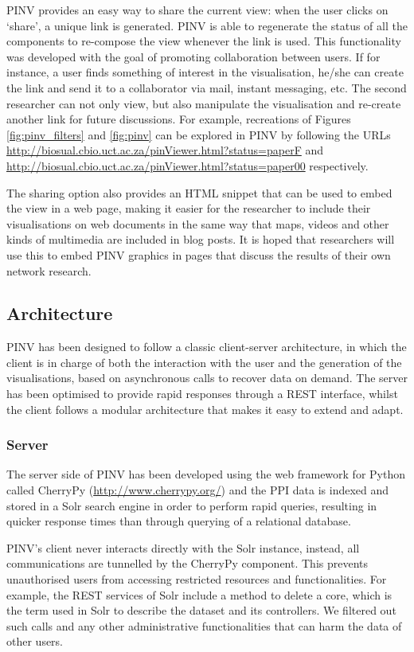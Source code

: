 PINV provides an easy way to share the current view: when the user clicks on `share', a unique link is generated. PINV is able to regenerate the status of all the components to re-compose the view whenever the link is used. 
This functionality was developed with the goal of promoting collaboration between users. If for instance, a user finds something of interest in the visualisation, he/she can create the link and send it to a collaborator via mail, instant messaging, etc. The second researcher can not only view, but also manipulate the visualisation and re-create another link for future discussions. For example, recreations of Figures \ref{fig:pinv_filters} and \ref{fig:pinv} can be explored in PINV by following the URLs \url{http://biosual.cbio.uct.ac.za/pinViewer.html?status=paperF} and \url{http://biosual.cbio.uct.ac.za/pinViewer.html?status=paper00} respectively.

The sharing option also provides an HTML snippet that can be used to embed the view in a web page, making it easier for the researcher to include their visualisations on web documents in the same way that maps, videos and other kinds of multimedia are included in blog posts. It is hoped that researchers will use this to embed PINV graphics in pages that discuss the results of their own network research.

\subsection{Architecture} \label{pinv_architecture}
PINV has been designed to follow a classic client-server architecture, in which the client is in charge of both the interaction with the user and the generation of the visualisations, based on asynchronous calls to recover data on demand. The server has been optimised to provide rapid responses through a REST interface, whilst the client follows a modular architecture that makes it easy to extend and adapt. 


\subsubsection{Server}
The server side of PINV has been developed using the web framework for Python called CherryPy (\url{http://www.cherrypy.org/}) and the PPI data is indexed and stored in a Solr search engine \cite{KUC2013} in order to perform rapid queries, resulting in quicker response times than through querying of a relational database.

PINV's client never interacts directly with the Solr instance, instead, all communications are tunnelled by the CherryPy component.  This prevents unauthorised users from accessing restricted resources and functionalities. For example, the REST services of Solr include a method to delete a core, which is the term used in Solr to describe the dataset and its controllers. We filtered out such calls and any other administrative functionalities that can harm the data of other users.

